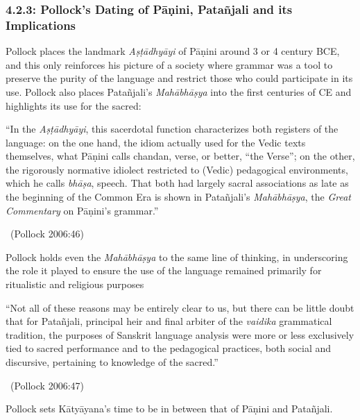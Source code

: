 \vspace{-.3cm}

\subsubsection*{4.2.3: Pollock’s Dating of Pāṇini, Patañjali and its Implications}

\vspace{-.2cm}

Pollock places the landmark \textit{Aṣṭādhyāyi} of Pāṇini around 3 or 4 century BCE, and this only reinforces his picture of a society where grammar was a tool to preserve the purity of the language and restrict those who could participate in its use. Pollock also places Patañjali’s \textit{Mahābhāṣya} into the first centuries of CE and highlights its use for the sacred:

\begin{myquote}
“In the \textit{Aṣṭādhyāyi}, this sacerdotal function characterizes both registers of the language: on the one hand, the idiom actually used for the Vedic texts themselves, what Pāṇini calls chandan, verse, or better, “the Verse”; on the other, the rigorously normative idiolect restricted to (Vedic) pedagogical environments, which he calls \textit{bhāṣa}, speech. That both had largely sacral associations as late as the beginning of the Common Era is shown in Patañjali’s \textit{Mahābhāṣya}, the \textit{Great Commentary} on Pāṇini’s grammar.” 

~\hfill (Pollock 2006:46)
\end{myquote}

Pollock holds even the \textit{Mahābhāṣya} to the same line of thinking, in underscoring the role it played to ensure the use of the language remained primarily for ritualistic and religious purposes

\begin{myquote}
“Not all of these reasons may be entirely clear to us, but there can be little doubt that for Patañjali, principal heir and final arbiter of the \textit{vaidika} grammatical tradition, the purposes of Sanskrit language analysis were more or less exclusively tied to sacred performance and to the pedagogical practices, both social and discursive, pertaining to knowledge of the sacred.” 

~\hfill (Pollock 2006:47)
\end{myquote}

Pollock sets Kātyāyana’s time to be in between that of Pāṇini and Patañjali.

